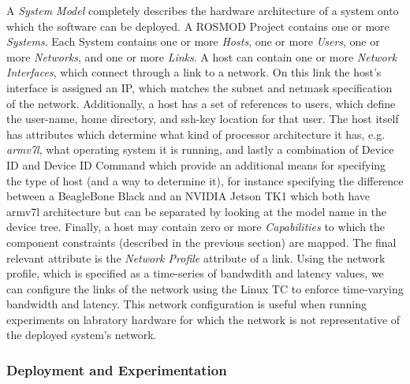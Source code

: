 A \emph{System Model} completely describes the hardware architecture
of a system onto which the software can be deployed. A ROSMOD Project
contains one or more \emph{Systems}. Each System contains one or
more \emph{Hosts}, one or more \emph{Users}, one or more
\emph{Networks}, and one or more \emph{Links}.  A host can contain one
or more \emph{Network Interfaces}, which connect through a link to a
network.  On this link the host's interface is assigned an IP, which
matches the subnet and netmask specification of the network.
Additionally, a host has a set of references to users, which define
the user-name, home directory, and ssh-key location for that user.
The host itself has attributes which determine what kind of processor
architecture it has, e.g. \emph{armv7l}, what operating system it is
running, and lastly a combination of Device ID and Device ID Command
which provide an additional means for specifying the type of host (and
a way to determine it), for instance specifying the difference between
a BeagleBone Black and an NVIDIA Jetson TK1 which both have armv7l
architecture but can be separated by looking at the model name in the
device tree.  Finally, a host may contain zero or more
\emph{Capabilities} to which the component constraints (described in
the previous section) are mapped.  The final relevant attribute is the
\emph{Network Profile} attribute of a link.  Using the network
profile, which is specified as a time-series of bandwdith and latency
values, we can configure the links of the network using the Linux TC
to enforce time-varying bandwidth and latency.  This network
configuration is useful when running experiments on labratory hardware
for which the network is not representative of the deployed system's
network.

\subsubsection{Deployment and Experimentation}

